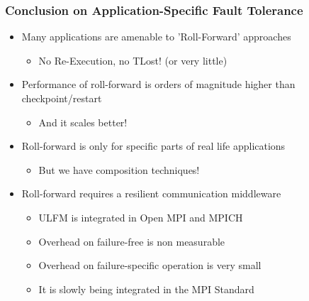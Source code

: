 \begin{frame}
  \frametitle{Conclusion on Application-Specific Fault Tolerance}

  \begin{itemize}
  \item Many applications are amenable to 'Roll-Forward' approaches
    \begin{itemize}
    \item No Re-Execution, no TLost! (or very little)
    \end{itemize}
  \item Performance of roll-forward is orders of magnitude higher than checkpoint/restart
    \begin{itemize}
    \item And it scales better!
    \end{itemize}
  \item Roll-forward is only for specific parts of real life applications
    \begin{itemize}
    \item But we have composition techniques!
    \end{itemize}
  \item Roll-forward requires a resilient communication middleware
    \begin{itemize}
    \item ULFM is integrated in Open MPI and MPICH
    \item Overhead on failure-free is non measurable
    \item Overhead on failure-specific operation is very small
    \item It is slowly being integrated in the MPI Standard
    \end{itemize}
  \end{itemize}
  
\end{frame}
